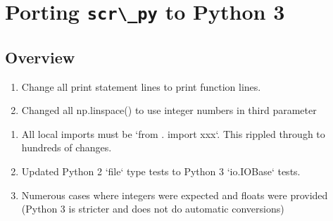\chapter{Porting \lstinline[style=HUGE]{scr\_py} to Python 3}
\label{chap:Portingscr_pytoPython3}

\section{Overview}
\label{sec:Portingscr_pytoPython3}

\begin{enumerate}
\item Change all print statement lines to print function lines.

\item Changed all np.linspace() to use integer numbers in third parameter


\end{enumerate}


\begin{enumerate}


\item All local imports must be `from . import xxx`. This rippled through to hundreds of changes.

\item Updated Python 2 `file` type tests to Python 3 `io.IOBase` tests.

\item Numerous cases where integers were expected and floats were provided (Python 3 is stricter and does not do automatic conversions)

\end{enumerate}

